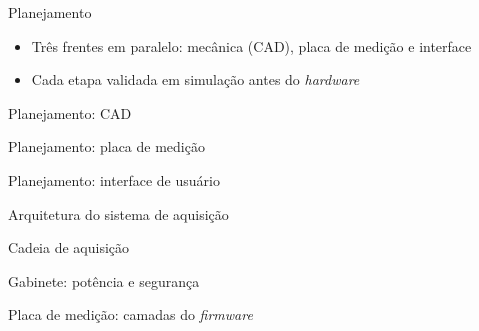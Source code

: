 
\begin{frame}{Planejamento}
  \centering
  \vspace{0.6em}
  \begin{itemize}
    \item Três frentes em paralelo: mecânica (CAD), placa de medição e
          interface
    \item Cada etapa validada em simulação antes do \textit{hardware}
  \end{itemize}
  \fonte
\end{frame}

\begin{frame}{Planejamento: CAD}
  \centering
  \fonte
\end{frame}

\begin{frame}{Planejamento: placa de medição}
  \centering
  \fonte
\end{frame}

\begin{frame}{Planejamento: interface de usuário}
  \centering
  \fonte
\end{frame}

\begin{frame}{Arquitetura do sistema de aquisição}
  \centering
  \fonte[Autor (2026); An (2026)]
\end{frame}

\begin{frame}{Cadeia de aquisição}
  \centering
  \fonte
\end{frame}

\begin{frame}{Gabinete: potência e segurança}
  \centering
  \fonte
\end{frame}

\begin{frame}{Placa de medição: camadas do \textit{firmware}}
  \centering
\end{frame}

